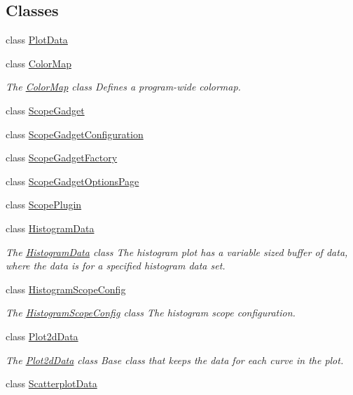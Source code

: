 \subsection*{Classes}
\begin{DoxyCompactItemize}
\item 
class \hyperlink{class_plot_data}{Plot\-Data}
\item 
class \hyperlink{class_color_map}{Color\-Map}
\begin{DoxyCompactList}\small\item\em The \hyperlink{class_color_map}{Color\-Map} class Defines a program-\/wide colormap. \end{DoxyCompactList}\item 
class \hyperlink{class_scope_gadget}{Scope\-Gadget}
\item 
class \hyperlink{class_scope_gadget_configuration}{Scope\-Gadget\-Configuration}
\item 
class \hyperlink{class_scope_gadget_factory}{Scope\-Gadget\-Factory}
\item 
class \hyperlink{class_scope_gadget_options_page}{Scope\-Gadget\-Options\-Page}
\item 
class \hyperlink{class_scope_plugin}{Scope\-Plugin}
\item 
class \hyperlink{class_histogram_data}{Histogram\-Data}
\begin{DoxyCompactList}\small\item\em The \hyperlink{class_histogram_data}{Histogram\-Data} class The histogram plot has a variable sized buffer of data, where the data is for a specified histogram data set. \end{DoxyCompactList}\item 
class \hyperlink{class_histogram_scope_config}{Histogram\-Scope\-Config}
\begin{DoxyCompactList}\small\item\em The \hyperlink{class_histogram_scope_config}{Histogram\-Scope\-Config} class The histogram scope configuration. \end{DoxyCompactList}\item 
class \hyperlink{class_plot2d_data}{Plot2d\-Data}
\begin{DoxyCompactList}\small\item\em The \hyperlink{class_plot2d_data}{Plot2d\-Data} class Base class that keeps the data for each curve in the plot. \end{DoxyCompactList}\item 
class \hyperlink{class_scatterplot_data}{Scatterplot\-Data}

\end{DoxyCompactItemize}
